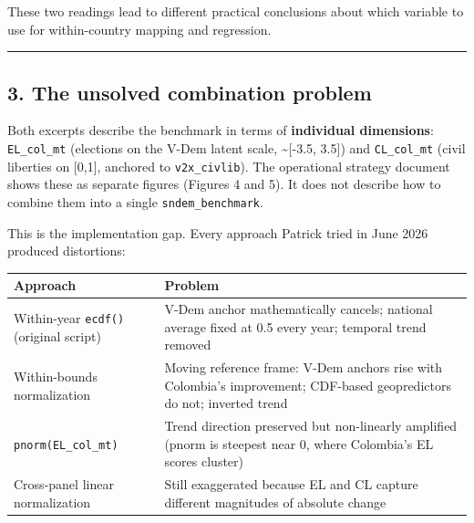\documentclass[
]{article}
\newcounter{none} %
\begin{document}
These two readings lead to different practical conclusions about which
variable to use for within-country mapping and regression.

\begin{center}\rule{0.5\linewidth}{0.5pt}\end{center}

\subsection{3. The unsolved combination
problem}\label{the-unsolved-combination-problem}

Both excerpts describe the benchmark in terms of \textbf{individual
dimensions}: \texttt{EL\_col\_mt} (elections on the V-Dem latent scale,
\textasciitilde{[}-3.5, 3.5{]}) and \texttt{CL\_col\_mt} (civil
liberties on {[}0,1{]}, anchored to \texttt{v2x\_civlib}). The
operational strategy document shows these as separate figures (Figures 4
and 5). It does not describe how to combine them into a single
\texttt{sndem\_benchmark}.

This is the implementation gap. Every approach Patrick tried in June
2026 produced distortions:

{\def\LTcaptype{none} %
\begin{longtable}[]{@{}
  >{\raggedright\arraybackslash}p{}
  >{\raggedright\arraybackslash}p{}@{}}
\toprule\noalign{}
\begin{minipage}[b]{\linewidth}\raggedright
Approach
\end{minipage} & \begin{minipage}[b]{\linewidth}\raggedright
Problem
\end{minipage} \\
\midrule\noalign{}
\endhead
\bottomrule\noalign{}
\endlastfoot
Within-year \texttt{ecdf()} (original script) & V-Dem anchor
mathematically cancels; national average fixed at 0.5 every year;
temporal trend removed \\
Within-bounds normalization & Moving reference frame: V-Dem anchors rise
with Colombia's improvement; CDF-based geopredictors do not; inverted
trend \\
\texttt{pnorm(EL\_col\_mt)} & Trend direction preserved but non-linearly
amplified (pnorm is steepest near 0, where Colombia's EL scores
cluster) \\
Cross-panel linear normalization & Still exaggerated because EL and CL
capture different magnitudes of absolute change \\
\end{longtable}
}
\end{document}
